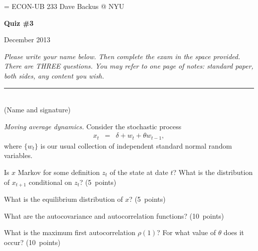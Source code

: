 \documentclass[11pt]{exam}
\begin{document}
\parskip=\bigskipamount
\parindent=0.0in
\thispagestyle{empty}
{\large ECON-UB 233 \hfill Dave Backus @ NYU}

\bigskip\bigskip
\centerline{\Large \bf Quiz \#3}
\centerline{December 2013}

\bigskip
{\it Please write your name below.
Then complete the exam in the space provided.
There are THREE questions.
You may refer to one page of notes:
standard paper, both sides, any content you wish.}

\bigskip
\begin{flushleft}
\rule{4in}{0.5pt} \\ (Name and signature)
\end{flushleft}


\begin{questions}
\item  {\it Moving average dynamics.\/}
Consider the stochastic process
\begin{eqnarray*}
    x_t &=& \delta + w_t + \theta w_{t-1}  ,
\end{eqnarray*}
where $\{ w_t \} $ is our usual collection of independent standard normal random variables.
%
\begin{parts}
\item Is $x$ Markov for some definition $z_t$ of the state at date $t$?
 What is the distribution of $x_{t+1}$ conditional on $z_t$?
 (5~points)
\item What is the equilibrium distribution of $x$?
 (5~points)
\item What are the autocovariance and autocorrelation functions?
 (10~points)
\item What is the maximum first autocorrelation $\rho(1)$?
For what value of $\theta$ does it occur?
 (10~points)
\end{parts}


\end{questions}
\end{document}
